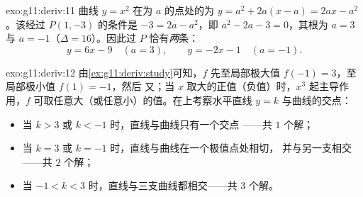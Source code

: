 \begin{solution}{exo:g11:deriv:11}
曲线 $y = x^2$ 在为 $a$ 的点处的为
$y = a^2 + 2a(x - a) = 2ax - a^2$。该经过 $P(1, -3)$ 的条件是
$-3 = 2a - a^2$，即 $a^2 - 2a - 3 = 0$，其根为 $a = 3$ 与
$a = -1$（$\Delta = 16$）。因此过
$P$ 恰有\emph{两}条：
\[
y = 6x - 9 \quad (a = 3),
\qquad
y = -2x - 1 \quad (a = -1).
\]
\end{solution}

\begin{solution}{exo:g11:deriv:12}
由\cref{ex:g11:deriv:study}可知，$f$ 先至局部极大值
$f(-1) = 3$，至局部极小值 $f(1) = -1$，然后
又；当 $x$ 取大的正值（负值）时，$x^3$ 起主导作用，$f$
可取任意大（或任意小）的值。在上考察水平直线
$y = k$ 与曲线的交点：
\begin{itemize}
  \item 当 $k > 3$ 或 $k < -1$ 时，直线与曲线只有一个交点
——共 $1$ 个解；
  \item 当 $k = 3$ 或 $k = -1$ 时，直线与曲线在一个极值点处相切，
        并与另一支相交——共 $2$ 个解；
  \item 当 $-1 < k < 3$ 时，直线与三支曲线都相交——共 $3$
        个解。
\end{itemize}
\end{solution}

